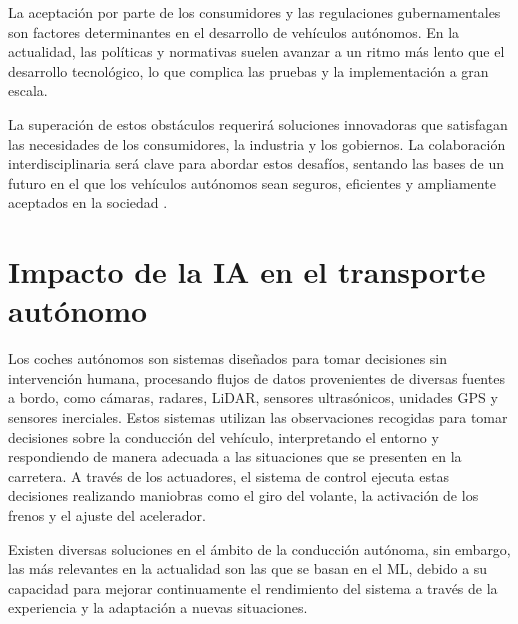 La aceptación por parte de los consumidores y las regulaciones gubernamentales son factores determinantes en el desarrollo de vehículos autónomos. En la actualidad, las políticas y normativas suelen avanzar a un ritmo más lento que el desarrollo tecnológico, lo que complica las pruebas y la implementación a gran escala.

La superación de estos obstáculos requerirá soluciones innovadoras que satisfagan las necesidades de los consumidores, la industria y los gobiernos. La colaboración interdisciplinaria será clave para abordar estos desafíos, sentando las bases de un futuro en el que los vehículos autónomos sean seguros, eficientes y ampliamente aceptados en la sociedad \cite{challenges-autonomous}.

\section{Impacto de la IA en el transporte autónomo}
\label{sec:ia-intro}

Los coches autónomos son sistemas diseñados para tomar decisiones sin intervención humana, procesando flujos de datos provenientes de diversas fuentes a bordo, como cámaras, radares, \ac{LiDAR}, sensores ultrasónicos, unidades \ac{GPS} y sensores inerciales. Estos sistemas utilizan las observaciones recogidas para tomar decisiones sobre la conducción del vehículo, interpretando el entorno y respondiendo de manera adecuada a las situaciones que se presenten en la carretera. A través de los actuadores, el sistema de control ejecuta estas decisiones realizando maniobras como el giro del volante, la activación de los frenos y el ajuste del acelerador.

Existen diversas soluciones en el ámbito de la conducción autónoma, sin embargo, las más relevantes en la actualidad son las que se basan en el \ac{ML}, debido a su capacidad para mejorar continuamente el rendimiento del sistema a través de la experiencia y la adaptación a nuevas situaciones. 


